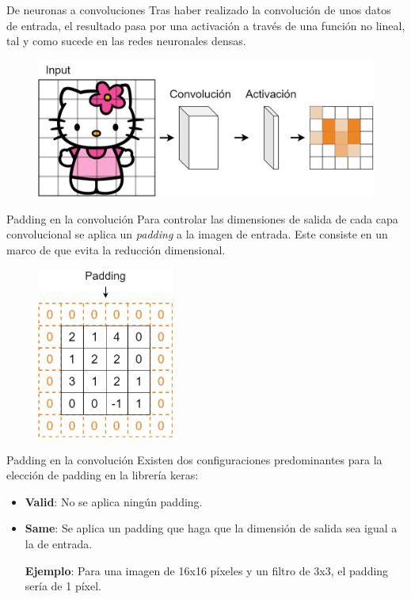 \begin{frame}{De neuronas a convoluciones}
Tras haber realizado la \alert{convolución} de unos datos de entrada, el resultado pasa por una \alert{activación} a través de una \alert{función no lineal}, tal y como sucede en las redes neuronales densas.

\begin{figure}
    \centering
    \includegraphics[width=\textwidth]{Slides/figures/Tema 3/ConvActivation.png}
\end{figure}
\end{frame}

\begin{frame}{Padding en la convolución}
Para controlar las \alert{dimensiones de salida} de cada capa convolucional se aplica un \textit{\alert{padding}} a la imagen de entrada. Este consiste en un marco de  que evita la reducción dimensional.

\begin{figure}
    \centering
    \includegraphics[width=0.4\textwidth]{Slides/figures/Tema 2/Padding.png}
\end{figure}
\end{frame}

\begin{frame}{Padding en la convolución}
Existen dos \alert{configuraciones} predominantes para la elección de padding en la librería \alert{keras}:
\begin{itemize}
    \item \textbf{\alert{Valid}}: No se aplica \alert{ningún} padding.
    \item \textbf{\alert{Same}}: Se aplica un padding que haga que la \alert{dimensión de salida} sea igual a la de \alert{entrada}.
    
    \vfill
    {\large \textbf{Ejemplo}: Para una imagen de 16x16 píxeles y un filtro de 3x3, el padding  sería de 1 píxel.}
\end{itemize}
\end{frame}


